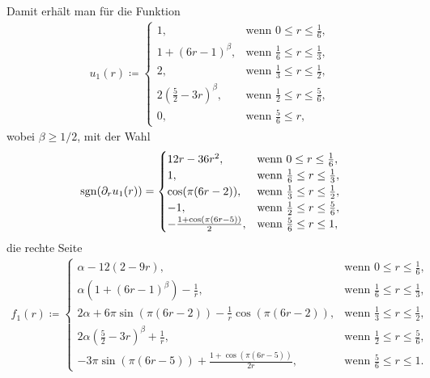 Damit erhält man für die Funktion
\begin{align*}
  u_1(r)\coloneqq
  \begin{cases}
    1, & \text{wenn } 0\leq r\leq\frac{1}{6},\\
    1+(6r-1)^\beta, & \text{wenn } \frac{1}{6}\leq r\leq\frac{1}{3},\\
    2, &\text{wenn } \frac{1}{3}\leq r\leq\frac{1}{2},\\
    2(\frac{5}{2}-3r)^\beta, &\text{wenn } \frac{1}{2}\leq r\leq\frac{5}{6},\\
    0, &\text{wenn } \frac{5}{6}\leq r,
  \end{cases}
\end{align*}
wobei $\beta\geq 1/2$, mit der Wahl
\begin{align*}
  \operatorname{sgn}(\partial_r u_1(r)) =
  \begin{cases}
    12r-36r^2, & \text{wenn } 0\leq r\leq\frac{1}{6},\\
    1, & \text{wenn } \frac{1}{6}\leq r\leq\frac{1}{3},\\
    \cos(\pi(6r-2)), &\text{wenn } \frac{1}{3}\leq r\leq\frac{1}{2},\\
    -1, &\text{wenn } \frac{1}{2}\leq r\leq\frac{5}{6},\\
    -\frac{1+\cos(\pi(6r-5))}{2}, &\text{wenn } \frac{5}{6}\leq r\leq 1,
  \end{cases}
\end{align*}
die rechte Seite
\begin{align*}
  f_1(r)\coloneqq 
  \begin{cases}
    \alpha-12(2-9r), & \text{wenn } 0\leq r\leq\frac{1}{6},\\
    \alpha(1+(6r-1)^\beta)-\frac{1}{r}, & \text{wenn } \frac{1}{6}\leq r\leq
    \frac{1}{3},\\
    2\alpha+6\pi\sin(\pi(6r-2))-\frac{1}{r}\cos(\pi(6r-2)), &
    \text{wenn } \frac{1}{3}\leq r\leq\frac{1}{2},\\
    2\alpha(\frac{5}{2}-3r)^\beta+\frac{1}{r},&
    \text{wenn } \frac{1}{2}\leq r\leq\frac{5}{6},\\
    -3\pi\sin(\pi(6r-5))+\frac{1+\cos(\pi(6r-5))}{2r}, &
    \text{wenn } \frac{5}{6}\leq r\leq 1.
  \end{cases}
\end{align*}

